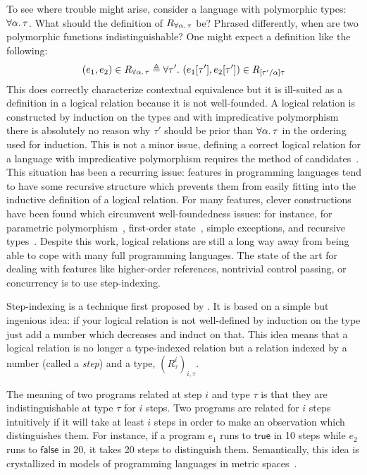 To see where trouble might arise, consider a language with polymorphic
types: $\forall \alpha.\, \tau$. What should the definition of
$R_{\forall \alpha.\, \tau}$ be? Phrased differently, when are two
polymorphic functions indistinguishable? One might expect a definition
like the following:
\[
  (e_1, e_2) \in R_{\forall \alpha.\, \tau} \mathrel{\triangleq}
  \forall \tau'.\ (e_1[\tau'], e_2[\tau']) \in R_{[\tau'/\alpha]\tau}
\]
This does correctly characterize contextual equivalence but it is
ill-suited as a definition in a logical relation because it is not
well-founded. A logical relation is constructed by induction on the
types and with impredicative polymorphism there is absolutely no
reason why $\tau'$ should be prior than $\forall \alpha.\, \tau$ in
the ordering used for induction. This is not a minor issue, defining a
correct logical relation for a language with impredicative
polymorphism requires the method of
candidates~\citep{Girard:71,Girard:72}. This situation has been a
recurring issue: features in programming languages tend to have some
recursive structure which prevents them from easily fitting into the
inductive definition of a logical relation. For many features, clever
constructions have been found which circumvent well-foundedness
issues: for instance, for parametric
polymorphism~\citep{Girard:71,Girard:72}, first-order
state~\citep{Pitts:98}, simple exceptions, and recursive
types~\citep{Birkedal:99,Crary:07}. Despite this work, logical
relations are still a long way away from being able to cope with many
full programming languages. The state of the art for dealing with
features like higher-order references, nontrivial control passing, or
concurrency is to use step-indexing.

Step-indexing is a technique first proposed by \citet{Appel:01}. It is
based on a simple but ingenious idea: if your logical relation is not
well-defined by induction on the type just add a number which
decreases and induct on that. This idea means that a logical relation
is no longer a type-indexed relation but a relation indexed by a
number (called a \emph{step}) and a type, $(R_\tau^i)_{i, \tau}$.

The meaning of two programs related at step $i$ and type $\tau$ is
that they are indistinguishable at type $\tau$ for $i$ steps. Two
programs are related for $i$ steps intuitively if it will take at
least $i$ steps in order to make an observation which distinguishes
them. For instance, if a program $e_1$ runs to $\mathsf{true}$ in 10
steps while $e_2$ runs to $\mathsf{false}$ in 20, it takes 20 steps to
distinguish them. Semantically, this idea is crystallized in models of
programming languages in metric spaces~\citep{Escardo:98}.

